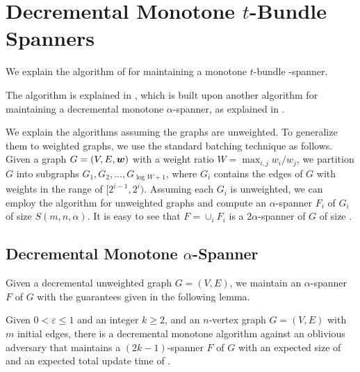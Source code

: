 \section{Decremental Monotone \( t \)-Bundle Spanners}\label{app:abraham}

We explain the algorithm of \cite{Abraham:2016aa} for maintaining a monotone \( t \)-bundle -spanner.

\abraham*

The algorithm is explained in , which is built upon another algorithm for maintaining a decremental monotone \( \alpha \)-spanner, as explained in . 

\begin{remark} \label{remark:weighted}
We explain the algorithms assuming the graphs are unweighted.
To generalize them to weighted graphs, we use the standard batching technique as follows.
Given a graph \( G = (V, E, \boldsymbol{w}) \) with a weight ratio \( W = \max _{i,j} w_i / w_j \), we partition \( G \) into subgraphs \( G_1, G_2, \dots, G_{\log_{} W + 1} \), where \( G_i \) contains the edges of \( G \) with weights in the range of \( [2^{i-1}, 2^{i} ) \).
Assuming each \( G_i \) is unweighted, we can employ the algorithm for unweighted graphs and compute an \( \alpha \)-spanner \( F_i \) of \( G_i \) of size \( S(m, n, \alpha) \).
It is easy to see that \( F = \cup _i F_i \) is a \( 2 \alpha \)-spanner of \( G \) of size .
\end{remark}







\subsection{Decremental Monotone \( \alpha \)-Spanner} \label{subsec:app_spanner}
Given a decremental unweighted graph \( G = (V, E) \), we maintain an \( \alpha \)-spanner \( F \) of \( G \) with the guarantees given in the following lemma.

\begin{lemma} \label{lem:decremental_spanner}
Given \( 0 < \varepsilon \leq 1 \) and an integer \( k \geq 2 \), and an \( n \)-vertex graph \( G = (V, E) \) with \( m \) initial edges, there is a decremental monotone algorithm against an oblivious adversary that maintains a \( (2k - 1) \)-spanner \( F \) of \( G \) with an expected size of  and an expected total update time of .
\end{lemma}


